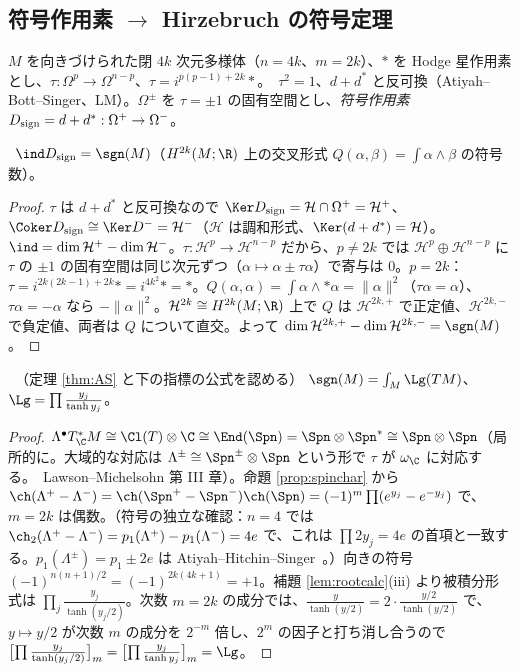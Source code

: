 \subsection{符号作用素 $\to$ Hirzebruch の符号定理}
$M$ を向きづけられた閉 $4k$ 次元多様体（$n=4k$、$m=2k$）、$\ast$ を Hodge 星作用素とし、$\tau:\Omega^p\to\Omega^{n-p}$、$\tau=i^{p(p-1)+2k}\ast$。\tC\ $\tau^2=1$、$d+d^*$ と反可換（Atiyah--Bott--Singer、LM）。$\Omega^\pm$ を $\tau=\pm1$ の固有空間とし、\emph{符号作用素} $D_{\rm sign}=d+d^*:\Omega^+\to\Omega^-$。
\begin{prop}[$\ind D_{\rm sign}=\sgn(M)$]\label{prop:indsign}\tP\
$\ind D_{\rm sign}=\sgn(M)$（$H^{2k}(M;\R)$ 上の交叉形式 $Q(\alpha,\beta)=\int\alpha\wedge\beta$ の符号数）。
\end{prop}
\begin{proof}
$\tau$ は $d+d^*$ と反可換なので $\Ker D_{\rm sign}=\mathcal H\cap\Omega^+=\mathcal H^+$、$\Coker D_{\rm sign}\cong\Ker D^-=\mathcal H^-$（$\mathcal H$ は調和形式、$\Ker(d+d^*)=\mathcal H$）。$\ind=\dim\mathcal H^+-\dim\mathcal H^-$。$\tau:\mathcal H^p\to\mathcal H^{n-p}$ だから、$p\ne2k$ では $\mathcal H^p\oplus\mathcal H^{n-p}$ に $\tau$ の $\pm1$ の固有空間は同じ次元ずつ（$\alpha\mapsto\alpha\pm\tau\alpha$）で寄与は $0$。$p=2k$：$\tau=i^{2k(2k-1)+2k}\ast=i^{4k^2}\ast=\ast$。$Q(\alpha,\alpha)=\int\alpha\wedge\ast\alpha=\|\alpha\|^2$（$\tau\alpha=\alpha$）、$\tau\alpha=-\alpha$ なら $-\|\alpha\|^2$。$\mathcal H^{2k}\cong H^{2k}(M;\R)$ 上で $Q$ は $\mathcal H^{2k,+}$ で正定値、$\mathcal H^{2k,-}$ で負定値、両者は $Q$ について直交。よって $\dim\mathcal H^{2k,+}-\dim\mathcal H^{2k,-}=\sgn(M)$。
\end{proof}
\begin{thm}[Hirzebruch の符号定理]\label{thm:signAS}\tP\ （定理 \ref{thm:AS} と下の指標の公式を認める）
$\sgn(M)=\int_M\Lg(TM)$、$\Lg=\prod\frac{y_j}{\tanh y_j}$。
\end{thm}
\begin{proof}
$\Lambda^\bullet T^*_{\C}M\cong\Cl(T)\otimes\C\cong\End(\Spn)=\Spn\otimes\Spn^*\cong\Spn\otimes\Spn$（局所的に。大域的な対応は $\Lambda^\pm\cong\Spn^\pm\otimes\Spn$ という形で $\tau$ が $\omega_{\C}$ に対応する。\tC\ Lawson--Michelsohn 第 III 章）。命題 \ref{prop:spinchar} から $\ch(\Lambda^+-\Lambda^-)=\ch(\Spn^+-\Spn^-)\ch(\Spn)=(-1)^m\prod(e^{y_j}-e^{-y_j})$ で、$m=2k$ は偶数。（符号の独立な確認：$n=4$ では $\ch_2(\Lambda^+-\Lambda^-)=p_1(\Lambda^+)-p_1(\Lambda^-)=4e$ で、これは $\prod2y_j=4e$ の首項と一致する。$p_1(\Lambda^\pm)=p_1\pm2e$ は Atiyah--Hitchin--Singer\tC\ 。）向きの符号 $(-1)^{n(n+1)/2}=(-1)^{2k(4k+1)}=+1$。補題 \ref{lem:rootcalc}(iii) より被積分形式は $\prod_j\frac{y_j}{\tanh(y_j/2)}$。次数 $m=2k$ の成分では、$\frac{y}{\tanh(y/2)}=2\cdot\frac{y/2}{\tanh(y/2)}$ で、$y\mapsto y/2$ が次数 $m$ の成分を $2^{-m}$ 倍し、$2^m$ の因子と打ち消し合うので $\bigl[\prod\frac{y_j}{\tanh(y_j/2)}\bigr]_{m}=\bigl[\prod\frac{y_j}{\tanh y_j}\bigr]_m=\Lg$。
\end{proof}
